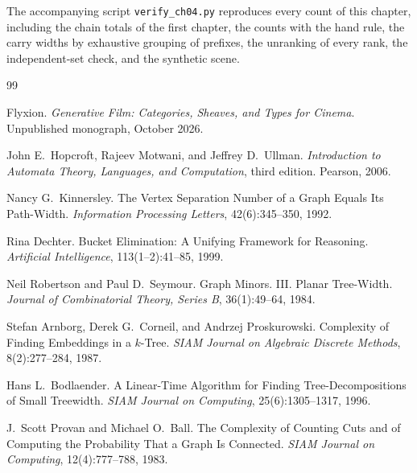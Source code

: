 \documentclass[11pt,twoside,openright]{book}
\theoremstyle{plain}
\theoremstyle{definition}
\theoremstyle{remark}
\begin{document}
The accompanying script \texttt{verify\_ch04.py} reproduces every count of this chapter, including the chain totals of the first chapter, the counts with the hand rule, the carry widths by exhaustive grouping of prefixes, the unranking of every rank, the independent-set check, and the synthetic scene.

\begin{thebibliography}{99}

Flyxion.
\newblock \emph{Generative Film: Categories, Sheaves, and Types for Cinema}.
\newblock Unpublished monograph, October 2026.

John E.\ Hopcroft, Rajeev Motwani, and Jeffrey D.\ Ullman.
\newblock \emph{Introduction to Automata Theory, Languages, and Computation}, third edition.
\newblock Pearson, 2006.

Nancy G.\ Kinnersley.
\newblock The Vertex Separation Number of a Graph Equals Its Path-Width.
\newblock \emph{Information Processing Letters}, 42(6):345--350, 1992.

Rina Dechter.
\newblock Bucket Elimination: A Unifying Framework for Reasoning.
\newblock \emph{Artificial Intelligence}, 113(1--2):41--85, 1999.

Neil Robertson and Paul D.\ Seymour.
\newblock Graph Minors. III. Planar Tree-Width.
\newblock \emph{Journal of Combinatorial Theory, Series B}, 36(1):49--64, 1984.

Stefan Arnborg, Derek G.\ Corneil, and Andrzej Proskurowski.
\newblock Complexity of Finding Embeddings in a $k$-Tree.
\newblock \emph{SIAM Journal on Algebraic Discrete Methods}, 8(2):277--284, 1987.

Hans L.\ Bodlaender.
\newblock A Linear-Time Algorithm for Finding Tree-Decompositions of Small Treewidth.
\newblock \emph{SIAM Journal on Computing}, 25(6):1305--1317, 1996.

J.\ Scott Provan and Michael O.\ Ball.
\newblock The Complexity of Counting Cuts and of Computing the Probability That a Graph Is Connected.
\newblock \emph{SIAM Journal on Computing}, 12(4):777--788, 1983.

\end{thebibliography}
\end{document}
